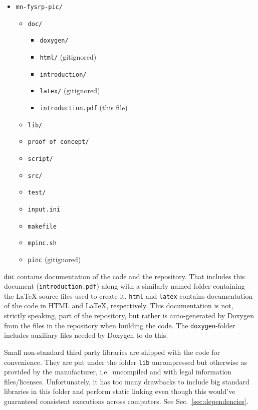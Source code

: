 \documentclass[10pt,a4paper]{article}
\newcommand{\refsec}[1]{Sec.~\ref{sec:#1}}
\begin{document}
\begin{itemize}[label={}]
	\item \verb$mn-fysrp-pic/$
	\begin{itemize}[label={}]
		\item \verb$doc/$
		\begin{itemize}[label={}]
			\item \verb$doxygen/$
			\item \verb$html/$ (gitignored)
			\item \verb$introduction/$
			\item \verb$latex/$ (gitignored)
			\item \verb$introduction.pdf$ (this file)
		\end{itemize}
		\item \verb$lib/$
		\item \verb$proof of concept/$
		\item \verb$script/$
		\item \verb$src/$
		\item \verb$test/$
		\item \verb$input.ini$
		\item \verb$makefile$
		\item \verb$mpinc.sh$
		\item \verb$pinc$ (gitignored)
	\end{itemize}
\end{itemize}

\verb$doc$ contains documentation of the code and the repository. That includes this document (\verb$introduction.pdf$) along with a similarly named folder containing the \LaTeX{} source files used to create it. \verb$html$ and \verb$latex$ contains documentation of the code in HTML and LaTeX, respectively. This documentation is not, strictly speaking, part of the repository, but rather is auto-generated by Doxygen from the files in the repository when building the code. The \verb$doxygen$-folder includes auxiliary files needed by Doxygen to do this.

Small non-standard third party libraries are shipped with the code for convenience. They are put under the folder \verb$lib$ uncompressed but otherwise as provided by the manufacturer, i.e.\ uncompiled and with legal information files/licenses. Unfortunately, it has too many drawbacks to include big standard libraries in this folder and perform static linking even though this would've guaranteed consistent executions across computers. See \refsec{dependencies}.
\end{document}

